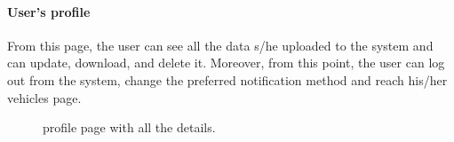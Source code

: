 \pagebreak

\paragraph{User's profile} From this page, the user can see all the data s/he uploaded to the system and can update, download, and delete it. Moreover, from this point, the user can log out from the system, change the preferred notification method and reach his/her vehicles page.

\begin{figure}[h!]
    \begin{minipage}{0.49\textwidth}
        \centering
        \caption{profile page with all the details.}
    \end{minipage}
    \hfill
    \begin{minipage}{0.49\textwidth}
        \centering

\end{minipage}
\end{figure}
